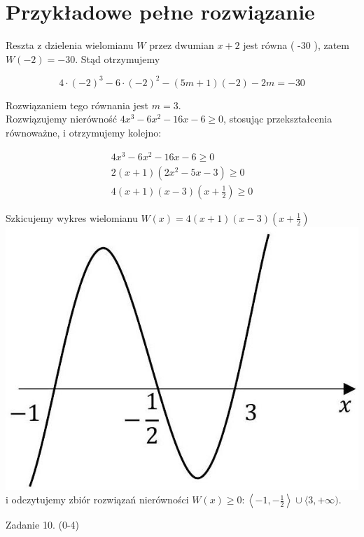 \documentclass[10pt]{article}
\begin{document}
\section*{Przykładowe pełne rozwiązanie}
Reszta z dzielenia wielomianu $W$ przez dwumian $x+2$ jest równa ( -30 ), zatem $W(-2)=-30$. Stąd otrzymujemy

$$
4 \cdot(-2)^{3}-6 \cdot(-2)^{2}-(5 m+1)(-2)-2 m=-30
$$

Rozwiązaniem tego równania jest $m=3$.\\
Rozwiązujemy nierówność $4 x^{3}-6 x^{2}-16 x-6 \geq 0$, stosując przekształcenia równoważne, i otrzymujemy kolejno:

$$
\begin{gathered}
4 x^{3}-6 x^{2}-16 x-6 \geq 0 \\
2(x+1)\left(2 x^{2}-5 x-3\right) \geq 0 \\
4(x+1)(x-3)\left(x+\frac{1}{2}\right) \geq 0
\end{gathered}
$$

Szkicujemy wykres wielomianu $W(x)=4(x+1)(x-3)\left(x+\frac{1}{2}\right)$\\
\includegraphics[max width=\textwidth, center]{2025_02_07_368c3175bd12651af85ag-16}\\
i odczytujemy zbiór rozwiązań nierówności $W(x) \geq 0:\left\langle-1,-\frac{1}{2}\right\rangle \cup\langle 3,+\infty)$.

Zadanie 10. (0-4)
\end{document}
